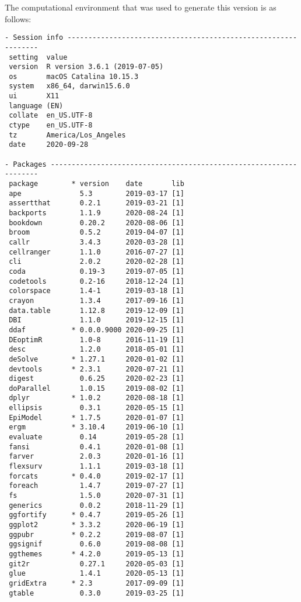 \documentclass [11pt, proquest] {uwthesis}[2015/03/03]
\begin{document}
The computational environment that was used to generate this version is
as follows:
\begin{verbatim}
- Session info ---------------------------------------------------------------
 setting  value                       
 version  R version 3.6.1 (2019-07-05)
 os       macOS Catalina 10.15.3      
 system   x86_64, darwin15.6.0        
 ui       X11                         
 language (EN)                        
 collate  en_US.UTF-8                 
 ctype    en_US.UTF-8                 
 tz       America/Los_Angeles         
 date     2020-09-28                  

- Packages -------------------------------------------------------------------
 package        * version    date       lib
 ape              5.3        2019-03-17 [1]
 assertthat       0.2.1      2019-03-21 [1]
 backports        1.1.9      2020-08-24 [1]
 bookdown         0.20.2     2020-08-06 [1]
 broom            0.5.2      2019-04-07 [1]
 callr            3.4.3      2020-03-28 [1]
 cellranger       1.1.0      2016-07-27 [1]
 cli              2.0.2      2020-02-28 [1]
 coda             0.19-3     2019-07-05 [1]
 codetools        0.2-16     2018-12-24 [1]
 colorspace       1.4-1      2019-03-18 [1]
 crayon           1.3.4      2017-09-16 [1]
 data.table       1.12.8     2019-12-09 [1]
 DBI              1.1.0      2019-12-15 [1]
 ddaf           * 0.0.0.9000 2020-09-25 [1]
 DEoptimR         1.0-8      2016-11-19 [1]
 desc             1.2.0      2018-05-01 [1]
 deSolve        * 1.27.1     2020-01-02 [1]
 devtools       * 2.3.1      2020-07-21 [1]
 digest           0.6.25     2020-02-23 [1]
 doParallel       1.0.15     2019-08-02 [1]
 dplyr          * 1.0.2      2020-08-18 [1]
 ellipsis         0.3.1      2020-05-15 [1]
 EpiModel       * 1.7.5      2020-01-07 [1]
 ergm           * 3.10.4     2019-06-10 [1]
 evaluate         0.14       2019-05-28 [1]
 fansi            0.4.1      2020-01-08 [1]
 farver           2.0.3      2020-01-16 [1]
 flexsurv         1.1.1      2019-03-18 [1]
 forcats        * 0.4.0      2019-02-17 [1]
 foreach          1.4.7      2019-07-27 [1]
 fs               1.5.0      2020-07-31 [1]
 generics         0.0.2      2018-11-29 [1]
 ggfortify      * 0.4.7      2019-05-26 [1]
 ggplot2        * 3.3.2      2020-06-19 [1]
 ggpubr         * 0.2.2      2019-08-07 [1]
 ggsignif         0.6.0      2019-08-08 [1]
 ggthemes       * 4.2.0      2019-05-13 [1]
 git2r            0.27.1     2020-05-03 [1]
 glue             1.4.1      2020-05-13 [1]
 gridExtra      * 2.3        2017-09-09 [1]
 gtable           0.3.0      2019-03-25 [1]

\end{verbatim}
\end{document}
